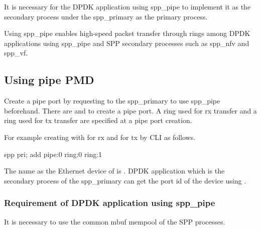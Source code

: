 \documentclass[a4paper,11pt,openany,oneside,english]{sphinxmanual}
\begin{document}
It is necessary for the DPDK application using spp\_pipe to implement
it as the secondary process under the spp\_primary as the primary
process.

Using spp\_pipe enables high-speed packet transfer through rings
among DPDK applications using spp\_pipe and SPP secondary processes
such as spp\_nfv and spp\_vf.


\subsection{Using pipe PMD}
\label{\detokenize{usecases/pipe_pmd:using-pipe-pmd}}
Create a pipe port by requesting to the spp\_primary to use spp\_pipe
beforehand.
There are {\hyperref[\detokenize{commands/primary:commands-primary-add}]{}} and
{\hyperref[\detokenize{api_ref/spp_primary:api-spp-ctl-spp-primary-put-ports}]{}} to create a pipe
port.
A ring used for rx transfer and a ring used for tx transfer are
specified at a pipe port creation.

For example creating  with  for rx and
 for tx by CLI as follows.

\begin{sphinxVerbatim}[commandchars=\\\{\},formatcom=\footnotesize]
spp \PYGZgt{} pri; add pipe:0 ring:0 ring:1
\end{sphinxVerbatim}

The name as the Ethernet device of  is .
DPDK application which is the secondary process of the spp\_primary
can get the port id of the device using .


\subsubsection{Requirement of DPDK application using spp\_pipe}
\label{\detokenize{usecases/pipe_pmd:requirement-of-dpdk-application-using-spp-pipe}}
It is necessary to use the common mbuf mempool of the SPP processes.

\begin{sphinxVerbatim}[commandchars=\\\{\},formatcom=\footnotesize]

  

  
\end{sphinxVerbatim}
\end{document}
